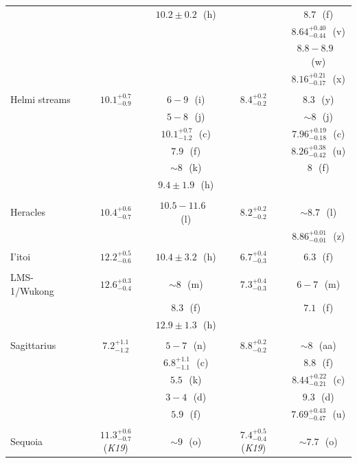 \begin{longtable}{l|c c|c c}
    & & $10.2\pm0.2$ \,\,(h) & & $8.7$ \,\,(f) \\
    & & & & $8.64^{+0.40}_{-0.44}$ \,\,(v) \\
    & & & & $8.8-8.9$ \,\,(w) \\
    & & & & $8.16^{+0.21}_{-0.17}$ \,\,(x) \\
    & & & & \\
    Helmi streams & $10.1^{+0.7}_{-0.9}$ & $6-9$ \,\,(i) & $8.4^{+0.2}_{-0.2}$ & $8.3$ \,\,(y) \\
    & & $5-8$ \,\,(j) & & $\sim8$ \,\,(j) \\
    & & $10.1^{+0.7}_{-1.2}$ \,\,(c) & & $7.96^{+0.19}_{-0.18}$ \,\,(c) \\
    & & $7.9$ \,\,(f) & & $8.26^{+0.38}_{-0.42}$ \,\,(u) \\
    & & $\sim8$ \,\,(k) & & $8$ \,\,(f) \\
    & & $9.4\pm1.9$ \,\,(h) & & \\
    & & & & \\
    Heracles & $10.4^{+0.6}_{-0.7}$ & $10.5-11.6$ \,\,(l) & $8.2^{+0.2}_{-0.2}$ & $\sim8.7$ \,\,(l) \\
    & & & & $8.86^{+0.01}_{-0.01}$ \,\,(z) \\
    & & & & \\
    I'itoi & $12.2^{+0.5}_{-0.6}$ & $10.4\pm3.2$ \,\,(h) & $6.7^{+0.4}_{-0.3}$ & $6.3$ \,\,(f) \\
    & & & & \\
    LMS-1/Wukong & $12.6^{+0.3}_{-0.4}$ & $\sim8$ \,\,(m) & $7.3^{+0.4}_{-0.3}$ & $6-7$ \,\,(m) \\
    & & $8.3$ \,\,(f) & & $7.1$ \,\,(f) \\
    & & $12.9\pm1.3$ \,\,(h) & & \\
    & & & & \\
    Sagittarius & $7.2^{+1.1}_{-1.2}$ & $5-7$ \,\,(n) & $8.8^{+0.2}_{-0.2}$ & $\sim8$ \,\,(aa) \\
    & & $6.8^{+1.1}_{-1.1}$ \,\,(c) & & $8.8$ \,\,(f)\\
    & & $5.5$ \,\,(k) & & $8.44^{+0.22}_{-0.21}$ \,\,(c) \\
    & & $3-4$ \,\,(d) & & $9.3$ \,\,(d) \\
    & & $5.9$ \,\,(f) & & $7.69^{+0.43}_{-0.47}$ \,\,(u) \\
    & & & & \\
    Sequoia & $11.3^{+0.6}_{-0.7}$ (\textit{K19}) & $\sim9$ \,\,(o) & $7.4^{+0.5}_{-0.4}$ (\textit{K19}) & $\sim7.7$ \,\,(o) \\

\end{longtable}

